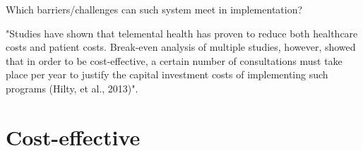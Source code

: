 Which barriers/challenges can such system meet in implementation?



"Studies have shown that telemental health has proven to reduce both
healthcare costs and patient costs. Break-even analysis of multiple studies, however, showed that in order
to be cost-effective, a certain number of consultations must take place per year to justify the capital
investment costs of implementing such programs (Hilty, et al., 2013)". \cite{considerations}

 


\section{Cost-effective}



